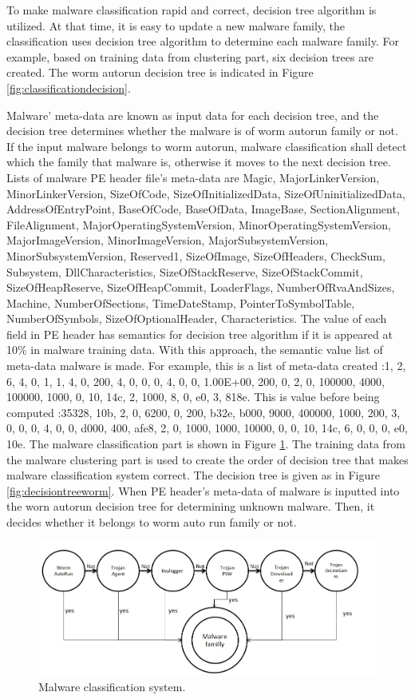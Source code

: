 To make malware classification rapid and correct, decision tree algorithm is utilized. At that time, it is easy to update a new malware family, the classification uses decision tree algorithm to determine each malware family. For example, based on training data from clustering part, six decision trees are created. The worm autorun decision tree is indicated in Figure \ref{fig:classificationdecision}.

Malware' meta-data are known as input data for each decision tree, and the decision tree determines whether the malware is of worm autorun family or not. If the input malware belongs to worm autorun, malware classification shall detect which the family that malware is, otherwise it moves to the next decision tree. Lists of malware PE header file's meta-data are Magic, MajorLinkerVersion, MinorLinkerVersion, SizeOfCode, SizeOfInitializedData, SizeOfUninitializedData, AddressOfEntryPoint, BaseOfCode, BaseOfData, ImageBase, SectionAlignment, FileAlignment, MajorOperatingSystemVersion, MinorOperatingSystemVersion, MajorImageVersion, MinorImageVersion, MajorSubsystemVersion, MinorSubsystemVersion, Reserved1, SizeOfImage, SizeOfHeaders, CheckSum, Subsystem, DllCharacteristics, SizeOfStackReserve, SizeOfStackCommit, SizeOfHeapReserve, SizeOfHeapCommit, LoaderFlags, NumberOfRvaAndSizes, Machine, NumberOfSections, TimeDateStamp, PointerToSymbolTable, NumberOfSymbols, SizeOfOptionalHeader, Characteristics. The value of each field in PE header has semantics for decision tree algorithm if it is appeared at 10\% in malware training data. With this approach, the semantic value list of meta-data malware is made. For example, this is a list of meta-data created :1, 2, 6, 4, 0, 1, 1, 4, 0, 200, 4, 0, 0, 0, 4, 0, 0, 1.00E+00, 200, 0, 2, 0, 100000, 4000, 100000, 1000, 0, 10, 14c, 2, 1000, 8, 0, e0, 3, 818e. This is value before being computed :35328, 10b, 2, 0, 6200, 0, 200, b32e, b000, 9000, 400000, 1000, 200, 3, 0, 0, 0, 4, 0, 0, d000, 400, afe8, 2, 0, 1000, 1000, 10000, 0, 0, 10, 14c, 6, 0, 0, 0, e0, 10e. 
The malware classification part is shown in Figure \ref{fig:classification}. The training data from the malware clustering part is used to create the order of decision tree that makes malware classification system correct.
The decision tree is given as in Figure \ref{fig:decisiontreeworm}. When PE header's meta-data of malware is inputted into the worn autorun decision tree for determining unknown malware. Then, it decides whether it belongs to worm auto run family or not.
\begin{figure}[h!]
\centering
\includegraphics[width=1\textwidth]{graph/classification.jpg}
\caption{Malware classification system.}
\label{fig:classification}
\end{figure}
